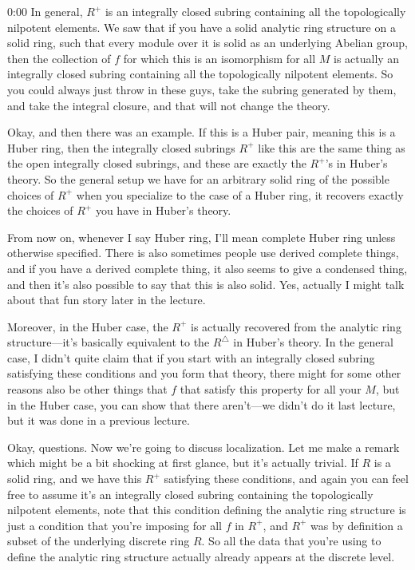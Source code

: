 \begin{unfinished}{0:00}
In general, $R^+$ is an integrally closed subring containing all the topologically nilpotent elements. We saw that if you have a solid analytic ring structure on a solid ring, such that every module over it is solid as an underlying Abelian group, then the collection of $f$ for which this is an isomorphism for all $M$ is actually an integrally closed subring containing all the topologically nilpotent elements. So you could always just throw in these guys, take the subring generated by them, and take the integral closure, and that will not change the theory.

Okay, and then there was an example. If this is a Huber pair, meaning this is a Huber ring, then the integrally closed subrings $R^+$ like this are the same thing as the open integrally closed subrings, and these are exactly the $R^+$'s in Huber's theory. So the general setup we have for an arbitrary solid ring of the possible choices of $R^+$ when you specialize to the case of a Huber ring, it recovers exactly the choices of $R^+$ you have in Huber's theory.

From now on, whenever I say Huber ring, I'll mean complete Huber ring unless otherwise specified. There is also sometimes people use derived complete things, and if you have a derived complete thing, it also seems to give a condensed thing, and then it's also possible to say that this is also solid. Yes, actually I might talk about that fun story later in the lecture.

Moreover, in the Huber case, the $R^+$ is actually recovered from the analytic ring structure---it's basically equivalent to the $R^\triangle$ in Huber's theory. In the general case, I didn't quite claim that if you start with an integrally closed subring satisfying these conditions and you form that theory, there might for some other reasons also be other things that $f$ that satisfy this property for all your $M$, but in the Huber case, you can show that there aren't---we didn't do it last lecture, but it was done in a previous lecture.

Okay, questions. Now we're going to discuss localization. Let me make a remark which might be a bit shocking at first glance, but it's actually trivial. If $R$ is a solid ring, and we have this $R^+$ satisfying these conditions, and again you can feel free to assume it's an integrally closed subring containing the topologically nilpotent elements, note that this condition defining the analytic ring structure is just a condition that you're imposing for all $f$ in $R^+$, and $R^+$ was by definition a subset of the underlying discrete ring $R$. So all the data that you're using to define the analytic ring structure actually already appears at the discrete level. 


\end{unfinished}
